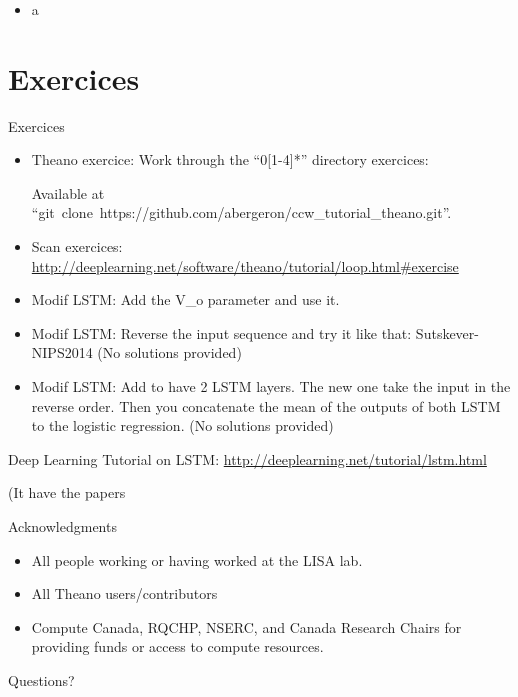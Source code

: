 \documentclass[utf8x,xcolor=pdftex,dvipsnames,table]{beamer}
\begin{document}
\begin{frame}
  \frametitle{}
\begin{itemize}
\item a
\end{itemize}
\end{frame}

\section{Exercices}
\begin{frame}{Exercices}
\begin{itemize}
  \item Theano exercice: Work through the ``0[1-4]*'' directory exercices:

    Available at ``git~clone~https://github.com/abergeron/ccw\_tutorial\_theano.git''.

  \item Scan exercices: \url{http://deeplearning.net/software/theano/tutorial/loop.html\#exercise}

  \item Modif LSTM: Add the V\_o parameter and use it.
  \item Modif LSTM: Reverse the input sequence and try it like that:
        Sutskever-NIPS2014 (No solutions provided)
  \item Modif LSTM: Add to have 2 LSTM layers. The new one take the
    input in the reverse order. Then you concatenate the mean of the
    outputs of both LSTM to the logistic regression. (No solutions provided)
\end{itemize}

Deep Learning Tutorial on LSTM: \url{http://deeplearning.net/tutorial/lstm.html}

(It have the papers
\end{frame}


\begin{frame}{Acknowledgments}
\begin{itemize}
\item All people working or having worked at the LISA lab.
\item All Theano users/contributors
\item Compute Canada, RQCHP, NSERC, and Canada Research Chairs for providing funds or access to compute resources.
\end{itemize}
\end{frame}

\begin{frame}
\begin{center}
\Huge
Questions?
\end{center}
\end{frame}
\end{document}
